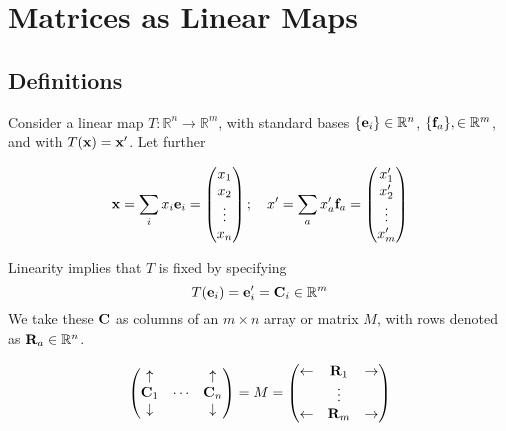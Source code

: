 \documentclass{article}
\begin{document}
\section{Matrices as Linear Maps}
\subsection{Definitions}
Consider a linear map $T: \mathbb R^n \to \mathbb R^m$, with standard bases $\{ \vb e_i \} \in \mathbb R^n$, $\{ \vb f_a \}, \in \mathbb R^m$, and with $T(\vb x) = \vb x'$.
Let further

\[ \vb x = \sum_i x_i \vb e_i = \begin{pmatrix}
        x_1 \\ x_2 \\ \vdots \\ x_n
    \end{pmatrix};\quad x' = \sum_a x_a' \vb f_a = \begin{pmatrix}
        x_1' \\ x_2' \\ \vdots \\ x_m'
    \end{pmatrix} \]

Linearity implies that $T$ is fixed by specifying
\[ T(\vb e_i) = \vb e_i' = \vb C_i \in \mathbb R^m \]
We take these $\vb C$ as columns of an $m \times n$ array or matrix $M$, with rows denoted as $\vb R_a \in \mathbb R^n$.

\[ \begin{pmatrix}
        \uparrow   &        & \uparrow   \\
        \vb C_1    & \cdots & \vb C_n    \\
        \downarrow &        & \downarrow
    \end{pmatrix} = M = \begin{pmatrix}
        \leftarrow & \vb R_1 & \rightarrow \\
                   & \vdots  &             \\
        \leftarrow & \vb R_m & \rightarrow
    \end{pmatrix} \]
\end{document}
